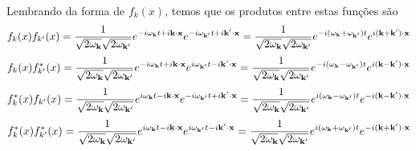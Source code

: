Lembrando da forma de $f_{k}(x)$, temos que os produtos entre estas funções são
    \begin{equation*}
        f_{k}(x)f_{k'}(x) 
        = \dfrac{1}{\sqrt{2\omega_{\vb{k}}}\sqrt{2\omega_{\vb{k}'}}} 
            e^{-i\omega_{\vb{k}}t + i\vb{k}\cdot\vb{x}} 
            e^{-i\omega_{\vb{k}'}t + i\vb{k}'\cdot\vb{x}} 
        = \dfrac{1}{\sqrt{2\omega_{\vb{k}}}\sqrt{2\omega_{\vb{k}'}}} 
            e^{-i(\omega_{\vb{k}} + \omega_{\vb{k}'})t} 
            e^{i(\vb{k}+\vb{k}')\cdot\vb{x}}
    \end{equation*}
    \begin{equation*}
        f_{k}(x)f_{k'}^{\ast}(x) 
        = \dfrac{1}{\sqrt{2\omega_{\vb{k}}}\sqrt{2\omega_{\vb{k}'}}} 
            e^{-i\omega_{\vb{k}}t + i\vb{k}\cdot\vb{x}} 
            e^{i\omega_{\vb{k'}}t - i\vb{k}'\cdot\vb{x}} 
        = \dfrac{1}{\sqrt{2\omega_{\vb{k}}}\sqrt{2\omega_{\vb{k}'}}} 
            e^{-i(\omega_{\vb{k}} - \omega_{\vb{k}'})t} 
            e^{i(\vb{k} - \vb{k}')\cdot\vb{x}}
    \end{equation*}
    \begin{equation*}
        f_{k}^{\ast}(x)f_{k'}(x) 
        = \dfrac{1}{\sqrt{2\omega_{\vb{k}}}\sqrt{2\omega_{\vb{k}'}}} 
            e^{i\omega_{\vb{k}}t - i\vb{k}\cdot\vb{x}} 
            e^{-i\omega_{\vb{k}'}t + i\vb{k}'\cdot\vb{x}} 
        = \dfrac{1}{\sqrt{2\omega_{\vb{k}}}\sqrt{2\omega_{\vb{k}'}}} 
            e^{i(\omega_{\vb{k}} - \omega_{\vb{k}'})t} 
            e^{-i(\vb{k} - \vb{k}')\cdot\vb{x}}
    \end{equation*}
    \begin{equation*}
        f_{k}^{\ast}(x)f_{k'}^{\ast}(x) 
        = \dfrac{1}{\sqrt{2\omega_{\vb{k}}}\sqrt{2\omega_{\vb{k}'}}} 
            e^{i\omega_{\vb{k}}t - i\vb{k}\cdot\vb{x}} 
            e^{i\omega_{\vb{k}'}t - i\vb{k}'\cdot\vb{x}} 
        = \dfrac{1}{\sqrt{2\omega_{\vb{k}}}\sqrt{2\omega_{\vb{k}'}}} 
            e^{i(\omega_{\vb{k}} + \omega_{\vb{k}'})t} 
            e^{-i(\vb{k} + \vb{k}')\cdot\vb{x}}
    \end{equation*}

